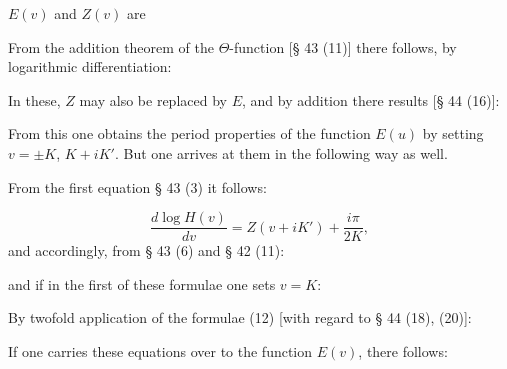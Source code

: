 
$E(v)$ and $Z(v)$ are 

From the addition theorem of the $\Theta$-function [§ 43 (11)] there
follows, by logarithmic differentiation:



In these, $Z$ may also be replaced by $E$, and by addition there
results [§ 44 (16)]:


From this one obtains the period properties of the function
$E(u)$ by setting $v=\pm K$, $K+iK'$. But one arrives at them
in the following way as well.

From the first equation § 43 (3) it follows:

\[
\dfrac{d\log H(v)}{dv} = Z(v+iK') + \dfrac{i\pi}{2K},
\]
and accordingly, from § 43 (6) and § 42 (11):

and if in the first of these formulae one sets $v=K$:


By twofold application of the formulae (12) [with regard
to § 44 (18), (20)]:


If one carries these equations over to the function $E(v)$, there
follows:


